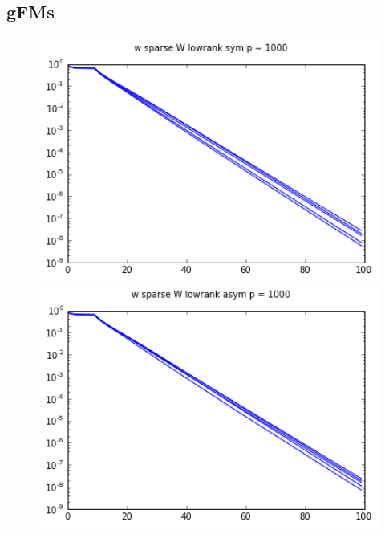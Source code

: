 \documentclass{article}
\begin{document}
\subsection{gFMs} \label{sec:result_gfm}

\begin{figure}[htbp]
  \centering
  \begin{minipage}{0.24\textwidth}
    \centering
    \includegraphics[width=1\textwidth]{gfm_plots/w_sparse_W_lowrank_sym}
  \end{minipage}
  \hfill
  \begin{minipage}{0.24\textwidth}
    \centering
    \includegraphics[width=1\textwidth]{gfm_plots/w_sparse_W_lowrank_asym}
  \end{minipage}
  \hfill
  \begin{minipage}{0.24\textwidth}

\end{minipage}
\end{figure}
\end{document}

